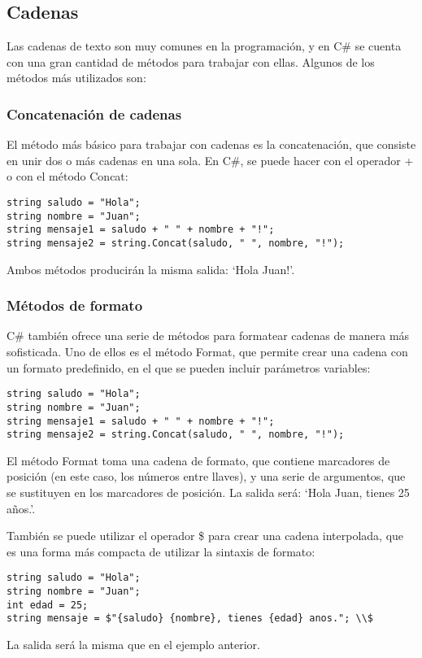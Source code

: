 \documentclass[executivepaper]{article}
\begin{document}
\subsection{Cadenas}

Las cadenas de texto son muy comunes en la programación, y en C\# se cuenta con una gran cantidad de métodos para trabajar con ellas. Algunos de los métodos más utilizados son:

\subsubsection*{Concatenación de cadenas}

El método más básico para trabajar con cadenas es la concatenación, que consiste en unir dos o más cadenas en una sola. En C\#, se puede hacer con el operador + o con el método Concat:
\begin{lstlisting}
string saludo = "Hola";
string nombre = "Juan";
string mensaje1 = saludo + " " + nombre + "!";
string mensaje2 = string.Concat(saludo, " ", nombre, "!");
\end{lstlisting}
Ambos métodos producirán la misma salida: \enquote*{Hola Juan!}.

\subsubsection*{Métodos de formato}

C\# también ofrece una serie de métodos para formatear cadenas de manera más sofisticada. Uno de ellos es el método Format, que permite crear una cadena con un formato predefinido, en el que se pueden incluir parámetros variables:
\begin{lstlisting}
string saludo = "Hola";
string nombre = "Juan";
string mensaje1 = saludo + " " + nombre + "!";
string mensaje2 = string.Concat(saludo, " ", nombre, "!");
\end{lstlisting}

El método Format toma una cadena de formato, que contiene marcadores de posición (en este caso, los números entre llaves), y una serie de argumentos, que se sustituyen en los marcadores de posición. La salida será: \enquote*{Hola Juan, tienes 25 años.}.

También se puede utilizar el operador \$ para crear una cadena interpolada, que es una forma más compacta de utilizar la sintaxis de formato:

\begin{lstlisting}
string saludo = "Hola";
string nombre = "Juan";
int edad = 25;
string mensaje = $"{saludo} {nombre}, tienes {edad} anos."; \\$
\end{lstlisting}
La salida será la misma que en el ejemplo anterior.
\end{document}
